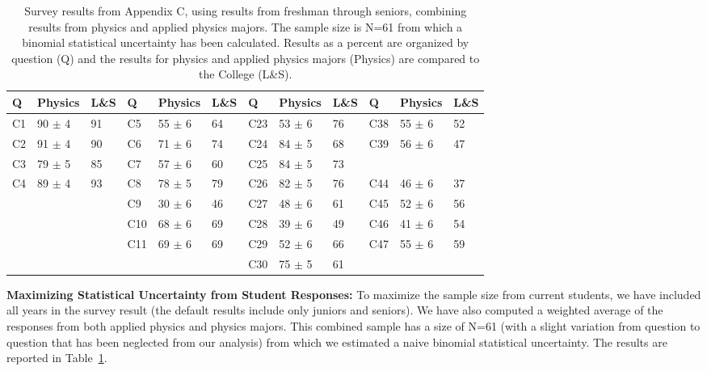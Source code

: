 \documentclass[12pt]{article}
\begin{document}
\begin{table}[htbp]
\caption{\label{tbl:appc} Survey results from Appendix C, using
  results from freshman through seniors, combining results from
  physics and applied physics majors. The sample size is N=61 from
  which a binomial statistical uncertainty has been calculated.
  Results as a percent are organized by question (Q) and the results
  for physics and applied physics majors (Physics) are compared to the
  College (L\&S).}
\begin{center}
\begin{tabular}{|lll|lll|lll|lll|}
\hline
Q & Physics & L\&S & Q & Physics & L\&S & Q & Physics & L\&S & Q & Physics & L\&S \\
\hline
C1 & 90 $\pm$ 4 & 91 & C5  & 55 $\pm$ 6 & 64 & C23 & 53 $\pm$ 6 & 76 & C38 & 55 $\pm$ 6 & 52 \\
C2 & 91 $\pm$ 4 & 90 & C6  & 71 $\pm$ 6 & 74 & C24 & 84 $\pm$ 5 & 68 & C39 & 56 $\pm$ 6 & 47 \\
C3 & 79 $\pm$ 5 & 85 & C7  & 57 $\pm$ 6 & 60 & C25 & 84 $\pm$ 5 & 73 &     &            &    \\                  
C4 & 89 $\pm$ 4 & 93 & C8  & 78 $\pm$ 5 & 79 & C26 & 82 $\pm$ 5 & 76 & C44 & 46 $\pm$ 6 & 37 \\
~  &            &    & C9  & 30 $\pm$ 6 & 46 & C27 & 48 $\pm$ 6 & 61 & C45 & 52 $\pm$ 6 & 56 \\
~  &            &    & C10 & 68 $\pm$ 6 & 69 & C28 & 39 $\pm$ 6 & 49 & C46 & 41 $\pm$ 6 & 54 \\
~  &            &    & C11 & 69 $\pm$ 6 & 69 & C29 & 52 $\pm$ 6 & 66 & C47 & 55 $\pm$ 6 & 59 \\
~  &            &    &     &            &    & C30 & 75 $\pm$ 5 & 61 &     &            &    \\
\hline 
\end{tabular}
\end{center}
\end{table}

\noindent
{\bf Maximizing Statistical Uncertainty from Student Responses:} To
maximize the sample size from current students, we have included all
years in the survey result (the default results include only juniors
and seniors).  We have also computed a weighted average of the
responses from both applied physics and physics majors.  This combined
sample has a size of N=61 (with a slight variation from question to
question that has been neglected from our analysis) from which we
estimated a naive binomial statistical uncertainty.  The results are
reported in Table~\ref{tbl:appc}.\\[3pt]
\end{document}
